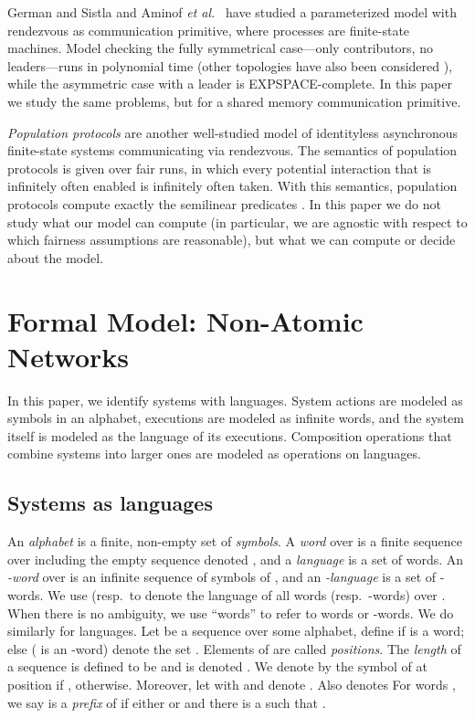 \documentclass{llncs}
\begin{document}
German and Sistla \cite{GS92} and Aminof {\em et al.}~\cite{AminofKRSV14} 
have studied a parameterized model with rendezvous as communication primitive, where processes are 
finite-state machines. Model checking the fully symmetrical case---only contributors, no leaders---runs in 
polynomial time (other topologies have also been considered \cite{AminofKRSV14}),
while the asymmetric case with a leader is EXPSPACE-complete. 
In this paper we study the same problems, but for a shared memory communication primitive. 

\emph{Population protocols} \cite{Angluin} are another well-studied model of identityless 
asynchronous finite-state systems communicating via rendezvous. The semantics 
of population protocols is given over fair runs, in which every potential interaction that is infinitely often enabled is infinitely often taken. With this semantics, population protocols compute exactly the semilinear predicates \cite{Angluin}. In this paper we do not study what our model can compute (in particular, we are agnostic with respect to which fairness assumptions are reasonable),
but what we can compute or decide about the model. 

  






\makeatletter{}

\section{Formal Model: Non-Atomic Networks}
\label{sec:prelim}

In this paper, we identify systems with languages. System actions are
modeled as symbols in an alphabet, executions are modeled as infinite words,
and the system itself is modeled as the
language of its executions. Composition operations that combine systems into larger ones
are modeled as operations on languages.

\subsection{Systems as languages}An \emph{alphabet}  is a finite, non-empty set of \emph{symbols}. A
\emph{word} over  is a finite sequence over  including the
empty sequence denoted , and a \emph{language} is a set of
words. An \emph{-word} over  is an infinite sequence of
symbols of , and an \emph{-language} is a set of
-words.  We use  (resp.\  to denote the
language of all words (resp.\ -words) over .  When there is
no ambiguity, we use ``words'' to refer to words or -words.  We do
similarly for languages.  Let  be a sequence over some alphabet, define
 if  is a word; else (
is an -word)  denote the set .
Elements of  are called \emph{positions}.  The \emph{length} of a
sequence  is defined to be  and is denoted
.  We denote by  the symbol of  at position
 if ,  otherwise. Moreover, let
 with  and  denote . Also  denotes  For words , we
say  is a \emph{prefix} of  if either  or  and
there is a  such that .
\end{document}
